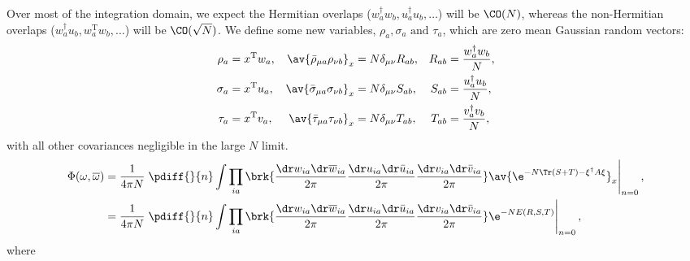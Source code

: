 \documentclass[12pt]{article}
\newcommand{\dg}{^\dagger}
\newcommand{\trans}{^\mathrm{T}}
\newcommand{\omb}{\overline{\omega}}
\newcommand{\dw}{\dr w}
\newcommand{\dwb}{\dr\overline{w}}
\newcommand{\du}{\dr u}
\newcommand{\dub}{\dr\bar{u}}
\newcommand{\dv}{\dr v}
\newcommand{\dvb}{\dr\bar{v}}
\begin{document}
Over most of the integration domain, we expect the Hermitian overlaps ($w_a\dg w_b, u_a\dg u_b,\ldots$) will be $\CO(N)$, whereas the non-Hermitian overlaps ($w_a\dg u_b, w_a\trans w_b,\ldots$) will be $\CO(\sqrt{N})$.
We define some new variables, $\rho_a,\sigma_a \text{ and } \tau_a$, which are zero mean Gaussian random vectors:
%
\begin{equation}\label{eq:reprstdef}
\begin{aligned}
  \rho_a &= x\trans w_a ,
    & \av{\bar{\rho}_{\mu a} \rho_{\nu b}}_x &= N\delta_{\mu\nu}R_{ab} ,
    & R_{ab}&=\frac{w_a\dg w_b}{N}, \\
  \sigma_a &= x\trans u_a ,
    & \av{\bar{\sigma}_{\mu a} \sigma_{\nu b}}_x &= N\delta_{\mu\nu}S_{ab} ,
    & S_{ab}&=\frac{u_a\dg u_b}{N}, \\
  \tau_a &= x\trans v_a,
    & \av{\bar{\tau}_{\mu a} \tau_{\nu b}}_x &= N\delta_{\mu\nu}T_{ab},
    & T_{ab}&=\frac{v_a\dg v_b}{N}, \\
\end{aligned}
\end{equation}
%
with all other covariances negligible in the large $N$ limit.
%
\begin{equation}\label{eq:phirepxi}
    \begin{aligned}
    \Phi(\omega,\omb) &= \frac{1}{4\pi N}  \left.\pdiff{}{n}
       \int \prod_{ia}\brk{ \frac{\dw_{ia}\dwb_{ia}}{2\pi} \frac{\du_{ia}\dub_{ia}}{2\pi} \frac{\dv_{ia}\dvb_{ia}}{2\pi} }
       \av{\e^{-N\Tr(S+T) - \xi\dg A \xi}}_x
       \right\rvert_{n=0}, \\
     &= \frac{1}{4\pi N}  \left.\pdiff{}{n}
       \int \prod_{ia}\brk{ \frac{\dw_{ia}\dwb_{ia}}{2\pi} \frac{\du_{ia}\dub_{ia}}{2\pi} \frac{\dv_{ia}\dvb_{ia}}{2\pi} }
       \e^{-NE(R,S,T)}
       \right\rvert_{n=0},
\end{aligned}
\end{equation}
%
where
%
\end{document}
